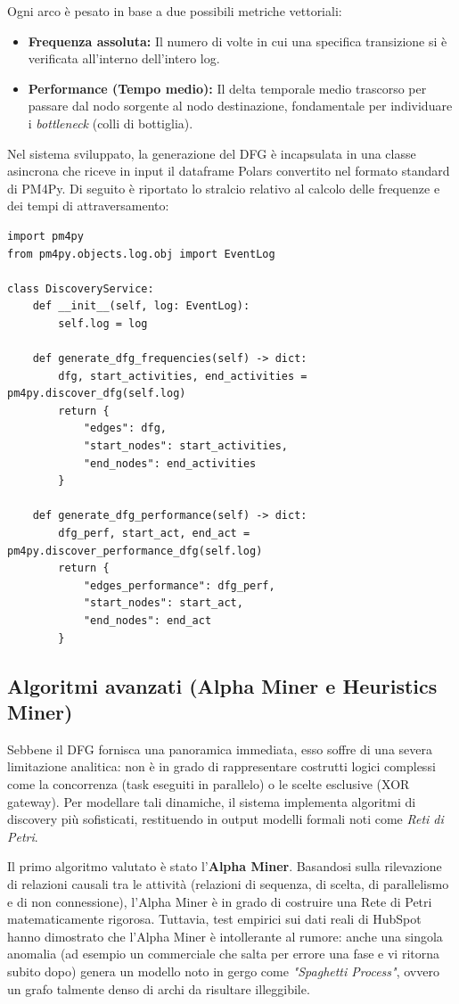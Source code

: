 \documentclass[12pt, a4paper]{report}
\begin{document}
Ogni arco è pesato in base a due possibili metriche vettoriali:
\begin{itemize}
    \item \textbf{Frequenza assoluta:} Il numero di volte in cui una specifica transizione si è verificata all'interno dell'intero log.
    \item \textbf{Performance (Tempo medio):} Il delta temporale medio trascorso per passare dal nodo sorgente al nodo destinazione, fondamentale per individuare i \textit{bottleneck} (colli di bottiglia).
\end{itemize}

Nel sistema sviluppato, la generazione del DFG è incapsulata in una classe asincrona che riceve in input il dataframe Polars convertito nel formato standard di PM4Py. Di seguito è riportato lo stralcio relativo al calcolo delle frequenze e dei tempi di attraversamento:

\begin{verbatim}
import pm4py
from pm4py.objects.log.obj import EventLog

class DiscoveryService:
    def __init__(self, log: EventLog):
        self.log = log

    def generate_dfg_frequencies(self) -> dict:
        dfg, start_activities, end_activities = pm4py.discover_dfg(self.log)
        return {
            "edges": dfg,
            "start_nodes": start_activities,
            "end_nodes": end_activities
        }

    def generate_dfg_performance(self) -> dict:
        dfg_perf, start_act, end_act = pm4py.discover_performance_dfg(self.log)
        return {
            "edges_performance": dfg_perf,
            "start_nodes": start_act,
            "end_nodes": end_act
        }
\end{verbatim}

\subsection{Algoritmi avanzati (Alpha Miner e Heuristics Miner)}
Sebbene il DFG fornisca una panoramica immediata, esso soffre di una severa limitazione analitica: non è in grado di rappresentare costrutti logici complessi come la concorrenza (task eseguiti in parallelo) o le scelte esclusive (XOR gateway). Per modellare tali dinamiche, il sistema implementa algoritmi di discovery più sofisticati, restituendo in output modelli formali noti come \textit{Reti di Petri}.

Il primo algoritmo valutato è stato l'\textbf{Alpha Miner}. Basandosi sulla rilevazione di relazioni causali tra le attività (relazioni di sequenza, di scelta, di parallelismo e di non connessione), l'Alpha Miner è in grado di costruire una Rete di Petri matematicamente rigorosa. Tuttavia, test empirici sui dati reali di HubSpot hanno dimostrato che l'Alpha Miner è intollerante al rumore: anche una singola anomalia (ad esempio un commerciale che salta per errore una fase e vi ritorna subito dopo) genera un modello noto in gergo come \textit{"Spaghetti Process"}, ovvero un grafo talmente denso di archi da risultare illeggibile.
\end{document}
